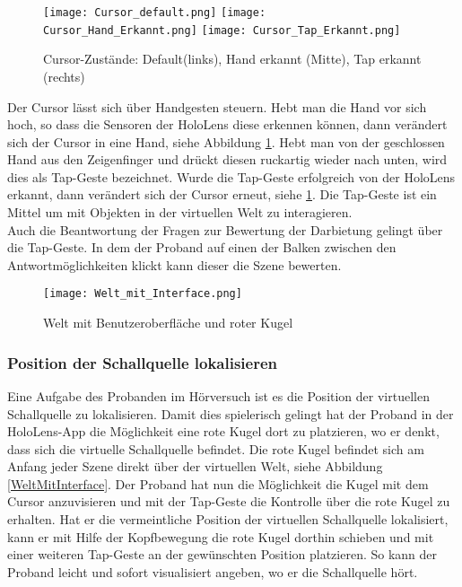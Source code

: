   \begin{figure}[H]
\centering
\texttt{[image: Cursor\_default.png]}
\texttt{[image: Cursor\_Hand\_Erkannt.png]}
\texttt{[image: Cursor\_Tap\_Erkannt.png]}
\caption{Cursor-Zustände: Default(links), Hand erkannt 
(Mitte), Tap erkannt (rechts) }
\label{fig:Cursor}
\end{figure} 
 
 Der Cursor lässt sich über Handgesten steuern. Hebt man die Hand vor sich hoch, so dass die Sensoren der HoloLens diese erkennen können, dann verändert sich der Cursor in eine Hand, siehe Abbildung \ref{fig:Cursor}. Hebt man von der geschlossen Hand aus den Zeigenfinger und drückt diesen ruckartig wieder nach unten, wird dies als Tap-Geste bezeichnet. Wurde die Tap-Geste erfolgreich von der HoloLens erkannt, dann verändert sich der Cursor erneut, siehe \ref{fig:Cursor}.   Die Tap-Geste ist ein Mittel um mit Objekten in der virtuellen Welt zu interagieren. \\
 
 Auch die Beantwortung der Fragen zur Bewertung der Darbietung gelingt über die Tap-Geste. In dem der Proband auf einen der Balken zwischen den Antwortmöglichkeiten klickt kann dieser die Szene bewerten.
 
  \begin{figure}[H]
\centering
\texttt{[image: Welt\_mit\_Interface.png]}
\caption{Welt mit Benutzeroberfläche und roter Kugel}
\label{fig:WeltMitInterface}
\end{figure} 
 
 
 \subsubsection{Position der Schallquelle lokalisieren}
 Eine Aufgabe des Probanden im Hörversuch ist es die Position der virtuellen Schallquelle zu lokalisieren. Damit dies spielerisch gelingt hat der Proband in der HoloLens-App die Möglichkeit eine rote Kugel dort zu platzieren, wo er denkt, dass sich die virtuelle Schallquelle befindet. Die rote Kugel befindet sich am Anfang jeder Szene direkt über der virtuellen Welt, siehe Abbildung \ref{WeltMitInterface}. Der Proband hat nun die Möglichkeit die Kugel mit dem Cursor anzuvisieren und mit der Tap-Geste die Kontrolle über die rote Kugel zu erhalten. Hat er die vermeintliche Position der virtuellen Schallquelle lokalisiert, kann er mit Hilfe der Kopfbewegung die rote Kugel dorthin schieben und mit einer weiteren Tap-Geste an der gewünschten Position platzieren. So kann der Proband leicht und sofort visualisiert angeben, wo er die Schallquelle hört. 
 
